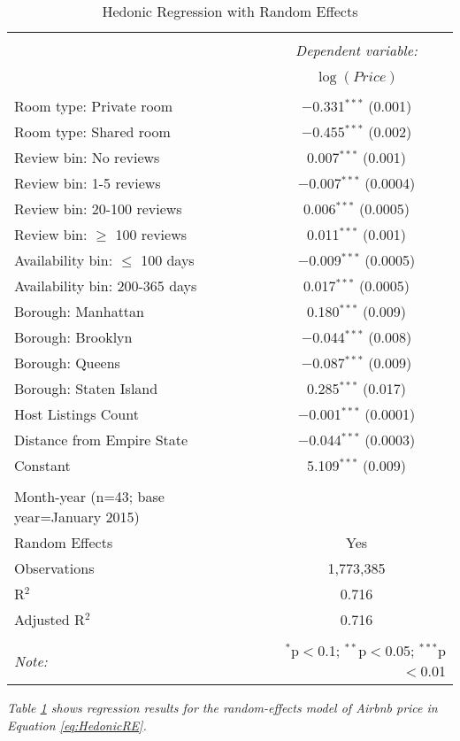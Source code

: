 \documentclass[12pt]{article}
\begin{document}
		\begin{table}[!htbp] 
			\begin{center} %
  				\caption{Hedonic Regression with Random Effects}
  				\label{tab:HedonicRE} 
				\begin{tabular}{@{\extracolsep{5pt}}lc} 
					\\[-1.8ex]\hline 
					\hline \\[-1.8ex] 
					& \multicolumn{1}{c}{\textit{Dependent variable:}} \\ 
					\cline{2-2} 
					\\[-1.8ex] & $\log(Price)$ \\ 
					\hline \\[-1.8ex]
  					Room type: Private room & $-$0.331$^{***}$ (0.001) \\ 
  					Room type: Shared room & $-$0.455$^{***}$ (0.002) \\ 
  					Review bin: No reviews & 0.007$^{***}$ (0.001) \\ 
  					Review bin: 1-5 reviews & $-$0.007$^{***}$ (0.0004) \\ 
  					Review bin: 20-100 reviews & 0.006$^{***}$ (0.0005) \\ 
  					Review bin: $\geq$ 100 reviews & 0.011$^{***}$ (0.001) \\
  					Availability bin: $\leq$ 100 days & $-$0.009$^{***}$ (0.0005) \\ 
  					Availability bin: 200-365 days & 0.017$^{***}$ (0.0005) \\ 
   					Borough: Manhattan & 0.180$^{***}$ (0.009) \\ 
  					Borough: Brooklyn & $-$0.044$^{***}$ (0.008) \\ 
 					Borough: Queens & $-$0.087$^{***}$ (0.009) \\ 
  					Borough: Staten Island & 0.285$^{***}$ (0.017) \\ 
 					Host Listings Count & $-$0.001$^{***}$ (0.0001) \\ 
   					Distance from Empire State & $-$0.044$^{***}$ (0.0003) \\ 
  					Constant & 5.109$^{***}$ (0.009) \\ 
 					\hline \\[-1.8ex]
					Month-year (n=43; base year=January 2015)\\
					Random Effects & Yes \\
					Observations & 1,773,385 \\ 
					R$^{2}$ & 0.716 \\ 
					Adjusted R$^{2}$ & 0.716 \\ 
					\hline 
					\hline \\[-1.8ex] 
					\textit{Note:}  & \multicolumn{1}{r}{$^{*}$p$<$0.1; $^{**}$p$<$0.05; $^{***}$p$<$0.01} \\ 
				\end{tabular} 
			\end{center}
			\emph{Table \ref{tab:HedonicRE} shows regression results for the random-effects model of Airbnb price in Equation \ref{eq:HedonicRE}.}
		\end{table}
\end{document}
